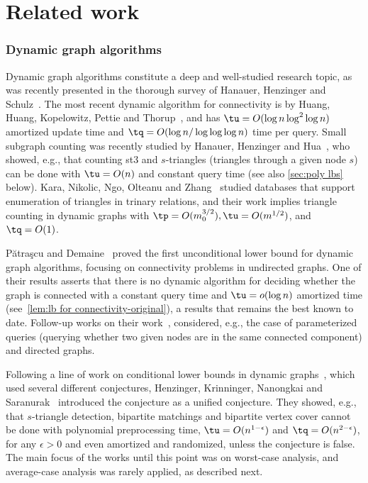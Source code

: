 \section{Related work}
\subsubsection{Dynamic graph algorithms}

Dynamic graph algorithms constitute a deep and well-studied research topic, 
as was recently presented in the thorough survey of Hanauer, Henzinger and Schulz~\cite{HanauerHS22}.
The most recent dynamic algorithm for connectivity is by
Huang, Huang, Kopelowitz, Pettie and Thorup~\cite{HuangHKPT23}, and has $\tu=O(\log n \log^2\log n)$ amortized update time and $\tq=O(\log n/\log\log\log n)$ time per query.
Small subgraph counting was recently studied by Hanauer, Henzinger and Hua~\cite{HanauerHH22}, 
who showed, e.g., that counting \paths st3 and $s$-triangles (triangles through a given node $s$) can be done with $\tu=O(n)$ and constant query time 
(see also \cref{sec:poly lbs} below).
Kara, Nikolic, Ngo, Olteanu and Zhang~\cite{KaraNNOZ20} studied databases that support enumeration of triangles in trinary relations,
and their work implies triangle counting in dynamic graphs with $\tp=O(m_0^{3/2}), \tu=O(m^{1/2})$, and~$\tq=O(1)$.

P\u{a}tra\c{s}cu and Demaine~\cite{PatrascuD06} 
proved the first unconditional lower bound for dynamic graph algorithms, focusing on connectivity problems in undirected graphs.
One of their results asserts that there is no dynamic algorithm for deciding whether the graph is connected with a constant query time
and $\tu=o(\log n)$	amortized time
(see~\cref{lem:lb for connectivity-original}),
a results that remains the best known to date.
Follow-up works on their work~\cite{PatrascuT11a,CliffordGL15,LarsenY23},
considered, e.g., the case of parameterized queries (querying whether two given nodes are in the same connected component) and directed graphs.


Following a line of work on conditional lower bounds in dynamic graphs~\cite{AbboudW14,Patrascu10,DorHZ00,RodittyZ11,KopelowitzPP16}, which used several different conjectures,
Henzinger, Krinninger, Nanongkai and Saranurak~\cite{HenzingerKNS15} introduced the \omv conjecture as a unified conjecture.
They showed, e.g., that 
$s$-triangle detection,
bipartite matchings
and
bipartite vertex cover cannot be done with
polynomial preprocessing time, 
	$\tu=O(n^{1-\epsilon})$
and
$\tq=O(n^{2-\epsilon})$,
for any $\epsilon>0$ and even amortized and randomized,
unless the \omv conjecture is false.	
The main focus of the works until this point was on worst-case analysis,
and average-case analysis was rarely applied, as described next.


